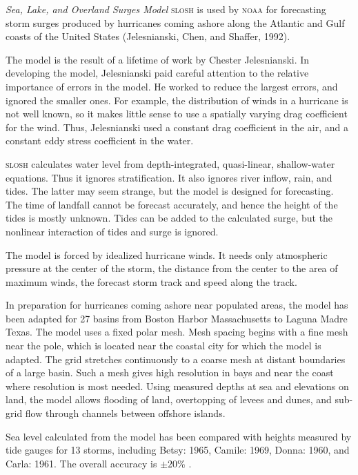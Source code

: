 \textit{Sea, Lake, and Overland Surges Model} \textsc{slosh} is used
by \textsc{noaa} for forecasting storm surges produced
by hurricanes coming ashore along the Atlantic and Gulf coasts of the
United States (Jelesnianski, Chen, and Shaffer, 1992).

The model is the result of a lifetime of work by Chester
Jelesnianski. In developing the model, Jelesnianski paid careful
attention to the relative importance of errors in the model. He worked
to reduce the largest errors, and ignored the smaller ones. For
example, the distribution of winds in a hurricane is not well known,
so it makes little sense to use a spatially varying drag
coefficient for the wind. Thus, Jelesnianski
used a constant drag coefficient in the air,
and a constant eddy stress coefficient in the water.

\textsc{slosh} calculates water level from depth-integrated,
quasi-linear, shallow-water equations. Thus it ignores
stratification. It also ignores river inflow, rain, and tides. The
latter may seem strange, but the model is designed for
forecasting. The time of landfall cannot be forecast accurately, and
hence the height of the tides is mostly unknown. Tides
can be added to the calculated surge,
but the nonlinear interaction of tides and surge is ignored.

The model is forced by idealized hurricane winds. It needs only
atmospheric pressure at the center of the storm, the distance from the
center to the area of maximum winds, the forecast storm track and
speed along the track.

In preparation for hurricanes coming ashore near populated areas, the
model has been adapted for 27 basins from Boston Harbor Massachusetts
to Laguna Madre Texas. The model uses a fixed polar mesh. Mesh spacing
begins with a fine mesh near the pole, which is located near the
coastal city for which the model is adapted. The grid stretches
continuously to a coarse mesh at distant boundaries of a large
basin. Such a mesh gives high resolution in bays and near the coast
where resolution is most needed. Using measured depths at sea and
elevations on land, the model allows flooding of land, overtopping of
levees and dunes, and sub-grid flow through channels between offshore
islands.

Sea level calculated from the model has been compared with heights
measured by tide gauges for 13 storms, including Betsy: 1965, Camile:
1969, Donna: 1960, and Carla: 1961. The overall
accuracy is $\pm 20$\% .

